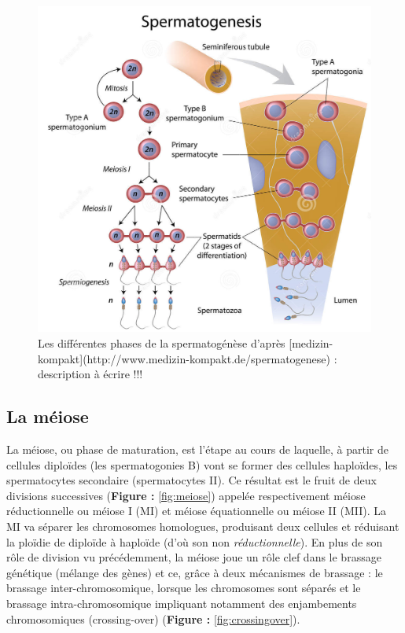 \documentclass[12pt,twoside]{reedthesis}
\theoremstyle{definition}
\theoremstyle{definition}
\theoremstyle{remark}
\begin{document}
  \begin{figure}
  
  {\centering \includegraphics[scale=0.35]{figure/spermatogenese2} 
  
  }
  
  \caption{Les différentes phases de la spermatogénèse d'après [medizin-kompakt](http://www.medizin-kompakt.de/spermatogenese) : description à écrire !!!}\label{fig:spermatogenese}
  \end{figure}
  
  \hypertarget{meiose}{\subsection{La méiose}\label{meiose}}
  
  La méiose, ou phase de maturation, est l'étape au cours de laquelle, à
  partir de cellules diploïdes (les spermatogonies B) vont se former des
  cellules haploïdes, les spermatocytes secondaire (spermatocytes II). Ce
  résultat est le fruit de deux divisions successives (\textbf{Figure :
  }\ref{fig:meiose}) appelée respectivement méiose réductionnelle ou
  méiose I (MI) et méiose équationnelle ou méiose II (MII). La MI va
  séparer les chromosomes homologues, produisant deux cellules et
  réduisant la ploïdie de diploïde à haploïde (d'où son non
  \emph{réductionnelle}). En plus de son rôle de division vu précédemment,
  la méiose joue un rôle clef dans le brassage génétique (mélange des
  gènes) et ce, grâce à deux mécanismes de brassage : le brassage
  inter-chromosomique, lorsque les chromosomes sont séparés et le brassage
  intra-chromosomique impliquant notamment des enjambements chromosomiques
  (crossing-over) (\textbf{Figure : }\ref{fig:crossingover}).
  
\end{document}
